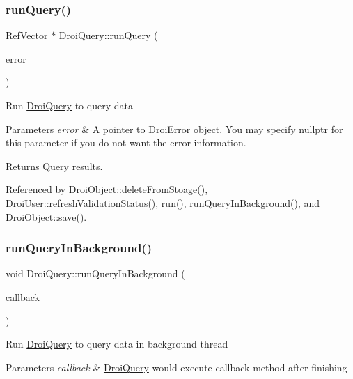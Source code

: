 \subsubsection{\texorpdfstring{run\+Query()}{runQuery()}}
{\footnotesize\ttfamily \hyperlink{class_ref_vector}{Ref\+Vector} $\ast$ Droi\+Query\+::run\+Query (\begin{DoxyParamCaption}\item[{\hyperlink{class_droi_error}{Droi\+Error} $\ast$}]{error }\end{DoxyParamCaption})}

Run \hyperlink{class_droi_query}{Droi\+Query} to query data 
\begin{DoxyParams}{Parameters}
{\em error} & A pointer to \hyperlink{class_droi_error}{Droi\+Error} object. You may specify nullptr for this parameter if you do not want the error information. \\
\hline
\end{DoxyParams}
\begin{DoxyReturn}{Returns}
Query results. 
\end{DoxyReturn}


Referenced by Droi\+Object\+::delete\+From\+Stoage(), Droi\+User\+::refresh\+Validation\+Status(), run(), run\+Query\+In\+Background(), and Droi\+Object\+::save().

\mbox{\label{class_droi_query_a2d0790ef682bcf456773e848c0661fac}} 
\subsubsection{\texorpdfstring{run\+Query\+In\+Background()}{runQueryInBackground()}}
{\footnotesize\ttfamily void Droi\+Query\+::run\+Query\+In\+Background (\begin{DoxyParamCaption}\item[{\hyperlink{struct_droi_callback}{Droi\+Callback}$<$ \hyperlink{class_ref_vector}{Ref\+Vector} $\ast$$>$\+::on\+Callback2}]{callback }\end{DoxyParamCaption})}

Run \hyperlink{class_droi_query}{Droi\+Query} to query data in background thread 
\begin{DoxyParams}{Parameters}
{\em callback} & \hyperlink{class_droi_query}{Droi\+Query} would execute callback method after finishing \\
\hline
\end{DoxyParams}


